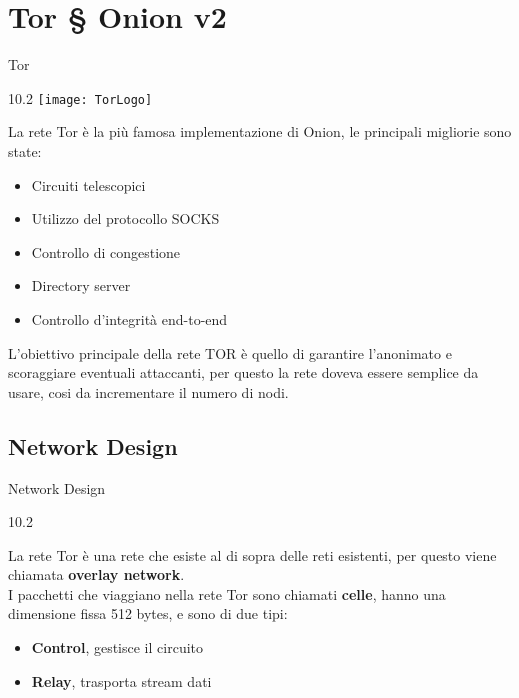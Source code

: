 \section{Tor § Onion v2}
\begin{frame}{Tor}
    \begin{wrapfigure}{1}{0.2\textwidth}
        \centering
        \texttt{[image: TorLogo]}
    \end{wrapfigure}

    La rete Tor è la più famosa implementazione di Onion, le principali migliorie sono state:
    \begin{itemize}
        \item Circuiti telescopici
        \item Utilizzo del protocollo SOCKS
        \item Controllo di congestione
        \item Directory server
        \item Controllo d'integrità end-to-end
    \end{itemize}
    L'obiettivo principale della rete TOR è quello di garantire l'anonimato e scoraggiare eventuali attaccanti, per questo la rete doveva essere semplice da usare, cosi da incrementare il numero di nodi. \\
\end{frame}

\subsection{Network Design}
\begin{frame}{Network Design}
    \begin{wrapfigure}{1}{0.2\textwidth}
        \centering
        
    \end{wrapfigure}

    La rete Tor è una rete che esiste al di sopra delle reti esistenti, per questo viene chiamata \textbf{overlay network}. \\
    I pacchetti che viaggiano nella rete Tor sono chiamati \textbf{celle}, hanno una dimensione fissa 512 bytes, e sono di due tipi:
    \begin{itemize}
        \item \textbf{Control}, gestisce il circuito
        \item \textbf{Relay}, trasporta stream dati
    \end{itemize}
\end{frame}

